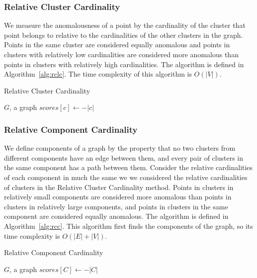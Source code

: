\subsubsection{Relative Cluster Cardinality}
We measure the anomalousness of a point by the cardinality of the cluster that point belongs to relative to the cardinalities of the other clusters in the graph.
Points in the same cluster are considered equally anomalous and points in clusters with relatively low cardinalities are considered more anomalous than points in clusters with relatively high cardinalities. The algorithm is defined in Algorithm~\ref{alg:rclc}. The time complexity of this algorithm is $O(|V|)$.



\begin{algorithm}[h]
    \caption{Relative Cluster Cardinality}
    \label{alg:rclc}
\begin{algorithmic}[1]
    \Require $G$, a graph
    \State $scores[c] \gets -|c|$
    \EndFor
\end{algorithmic}
\end{algorithm}

\subsubsection{Relative Component Cardinality}
We define components of a graph by the property that no two clusters from different components have an edge between them, and every pair of clusters in the same component has a path between them.
Consider the relative cardinalities of each component in much the same we we considered the relative cardinalities of clusters in the Relative Cluster Cardinality method.
Points in clusters in relatively small components are considered more anomalous than points in clusters in relatively large components, and points in clusters in the same component are considered equally anomalous. The algorithm is defined in Algorithm~\ref{alg:rcc}. This algorithm first finds the components of the graph, so its time complexity is $O(|E| + |V|)$.

\begin{algorithm}[h]
    \caption{Relative Component Cardinality}
    \label{alg:rcc}
\begin{algorithmic}[1]
    \Require $G$, a graph
        \State $scores[C] \gets -|C|$
    \EndFor
\end{algorithmic}
\end{algorithm}

